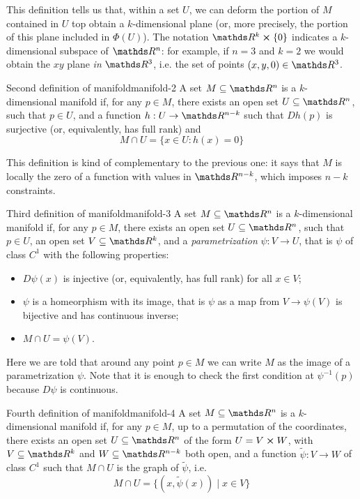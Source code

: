 \documentclass[12pt]{extarticle}
\begin{document}
This definition tells us that, within a set $U$, we can deform the portion of $M$ contained in $U$
top obtain a $k$-dimensional plane (or, more precisely, the portion of this plane included in
$\Phi(U)$).
The notation $\R^k \cross \{0\}$ indicates a $k$-dimensional subspace of $\R^n$: for example, if
$n = 3$ and $k = 2$ we would obtain the $xy$ plane \emph{in} $\R^3$, i.e. the set of points
$(x, y, 0) \in \R^3$.

\begin{definition}{Second definition of manifold}{manifold-2}
	A set $M \subseteq \R^n$ is a $k$-dimensional manifold if, for any $p \in M$, there exists an open
	set $U \subseteq \R^n$, such that $p \in U$, and a function $h: U \to \R^{n-k}$ such that $Dh(p)$
	is surjective (or, equivalently, has full rank) and
	\begin{equation}
		M \cap U = \{ x \in U : h(x) = 0 \}
	\end{equation}
\end{definition}

This definition is kind of complementary to the previous one: it says that $M$ is locally the zero
of a function with values in $\R^{n-k}$, which imposes $n-k$ constraints.

\begin{definition}{Third definition of manifold}{manifold-3}
	A set $M \subseteq \R^n$ is a $k$-dimensional manifold if, for any $p \in M$, there exists an open
	set $U \subseteq \R^n$, such that $p \in U$, an open set $V \subseteq \R^k$, and a
	\emph{parametrization} $\psi: V \to U$, that is $\psi$ of class $C^1$ with the following
	properties:
	\begin{itemize}
		\item $D \psi (x) $ is injective (or, equivalently, has full rank) for all $x \in V$;
		\item $\psi$ is a homeorphism with its image, that is $\psi$ as a map from $V \to \psi(V)$ is
		      bijective and has continuous inverse;
		\item $M \cap U = \psi(V)$.
	\end{itemize}
\end{definition}

Here we are told that around any point $p \in M$ we can write $M$ as the image of a parametrization
$\psi$. Note that it is enough to check the first condition at $\psi^{-1}(p)$ because $D\psi$ is
continuous.

\begin{definition}{Fourth definition of manifold}{manifold-4}
	A set $M \subseteq \R^n$ is a $k$-dimensional manifold if, for any $p \in M$, up to a permutation
	of the coordinates, there exists an open set $U \subseteq \R^n$ of the form $U = V \cross W$, with
	$V \subseteq \R^k$ and $W \subseteq \R^{n - k}$ both open, and a function $\tilde \psi: V \to W$
	of class $C^1$ such that $M \cap U$ is the graph of $\tilde \psi$, i.e.
	\begin{equation}
		M \cap U = \{ (x, \tilde \psi(x)) \mid x \in V\}
	\end{equation}
\end{definition}
\end{document}
